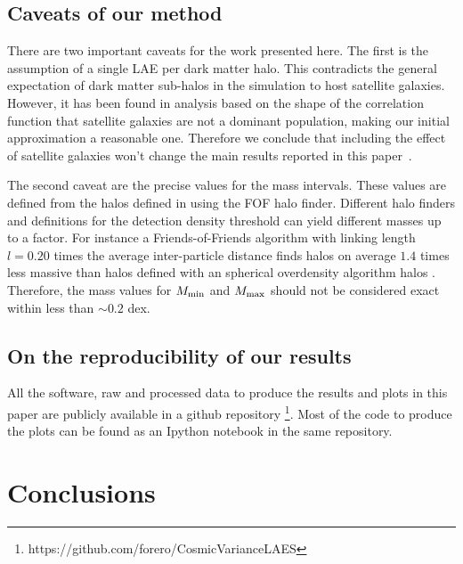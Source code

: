 \documentclass[usenatbib]{mn2e}
\newcommand{\documentname}{paper~}
\begin{document}
{\subsection{Caveats of our method}

There are two important caveats for the work presented here. The first is the
assumption of a single LAE per dark matter halo. This contradicts the
general expectation of dark matter sub-halos in the simulation to host
satellite galaxies. However, it has been found in analysis based on
the shape of the correlation function \citep{Jose2013b} that satellite
galaxies are not a dominant population, making our initial
approximation a reasonable one. Therefore we conclude that including
the effect of satellite galaxies won't change the main results
reported in this \documentname.

The second caveat are the precise values for the mass intervals. These
values are defined from the halos defined in using the FOF halo
finder. Different halo finders and definitions for the detection
density threshold can yield different masses up to a factor. For
instance a Friends-of-Friends algorithm with linking length $l=0.20$
times the average inter-particle distance finds halos on average $1.4$
times less massive than halos defined  with an spherical overdensity
algorithm halos \citep{Bolshoi}. Therefore, the mass values for
$M_{\rm min}$ and $M_{\rm max}$ should not be considered exact within
less than $\sim 0.2$ dex.  



\subsection{On the reproducibility of our results}

All the software, raw and processed data to produce the results
and plots in this paper are publicly available in a github
repository \footnote{https://github.com/forero/CosmicVarianceLAES}. Most
of the code to produce the plots can be found as an Ipython notebook
\citep{IPython} in the same repository.



\section{Conclusions}
\label{sec:conclusions}

}
\end{document}
